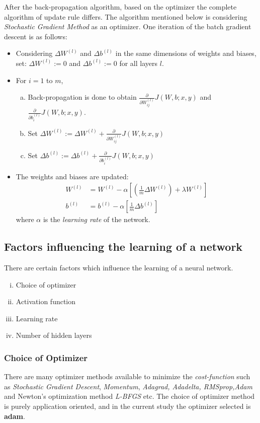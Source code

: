 After the back-propagation algorithm, based on the optimizer the complete algorithm of update rule differs. The algorithm mentioned below is considering \textit{Stochastic Gradient Method} as an optimizer. One iteration of the batch gradient descent is as follows:
\begin{itemize}
\item Considering $\Delta W^{(l)}$ and $\Delta b^{(l)}$ in the same dimensions of weights and biases, set: $\Delta W^{(l)} := 0$ and $\Delta b^{(l)} := 0$ for all layers $l$. 
\item For $i=1$ to $m$,
  \begin{enumerate}[a)]
   \item Back-propagation is done to obtain $\frac{\partial}{\partial W_{ij}^{(l)}} J(W,b; x, y)$ and $\frac{\partial}{\partial b_{i}^{(l)}} J(W,b; x, y)$.
   \item Set $\Delta W^{(l)} := \Delta W^{(l)}+\frac{\partial}{\partial W_{ij}^{(l)}} J(W,b; x, y)$
   \item Set $\Delta b^{(l)} := \Delta b^{(l)}+\frac{\partial}{\partial b_{i}^{(l)}} J(W,b; x, y)$
  \end{enumerate}
\item The weights and biases are updated:
\begin{align}
W^{(l)} &= W^{(l)} - \alpha \left[ \left(\frac{1}{m} \Delta W^{(l)} \right) + \lambda W^{(l)}\right] \\
b^{(l)} &= b^{(l)} - \alpha \left[\frac{1}{m} \Delta b^{(l)}\right]
\end{align}
where $\alpha$ is the \textit{learning rate} of the network.
\end{itemize}
\subsection{Factors influencing the learning of a network}
There are certain factors which influence the learning of a neural network. 
\begin{enumerate}[(i)]
\item Choice of optimizer
\item Activation function
\item Learning rate
\item Number of hidden layers
\end{enumerate}
\subsubsection{Choice of Optimizer}
There are many optimizer methods available to minimize the \textit{cost-function} such as \textit{Stochastic Gradient Descent}, \textit{Momentum}, \textit{{Adagrad}, {Adadelta}, {RMSprop},{Adam}} and Newton's optimization method \textit{L-BFGS} etc. The choice of optimizer method is purely application oriented, and in the current study the optimizer selected is \textbf{adam}.
